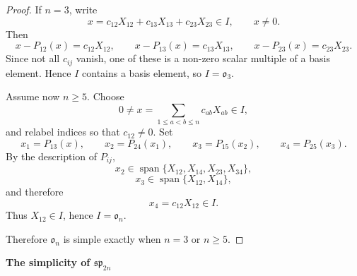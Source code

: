 \begin{proof}
    If $n=3$, write
    \[
        x=c_{12}X_{12}+c_{13}X_{13}+c_{23}X_{23}\in I,\qquad x\neq0.
    \]
    Then
    \[
        x-P_{12}(x)=c_{12}X_{12},\qquad
        x-P_{13}(x)=c_{13}X_{13},\qquad
        x-P_{23}(x)=c_{23}X_{23}.
    \]
    Since not all $c_{ij}$ vanish, one of these is a non-zero scalar multiple of a basis element. Hence $I$ contains a basis element, so $I=\mathfrak{o}_3$.

    Assume now $n\ge5$. Choose
    \[
        0\neq x=\sum_{1\le a<b\le n} c_{ab}X_{ab}\in I,
    \]
    and relabel indices so that $c_{12}\neq0$. Set
    \[
        x_1=P_{13}(x),\qquad x_2=P_{24}(x_1),\qquad x_3=P_{15}(x_2),\qquad x_4=P_{25}(x_3).
    \]
    By the description of $P_{ij}$,
    \[
        x_2\in \operatorname{span}\{X_{12},X_{14},X_{23},X_{34}\},
    \]
    \[
        x_3\in \operatorname{span}\{X_{12},X_{14}\},
    \]
    and therefore
    \[
        x_4=c_{12}X_{12}\in I.
    \]
    Thus $X_{12}\in I$, hence $I=\mathfrak{o}_n$.

    Therefore $\mathfrak{o}_n$ is simple exactly when $n=3$ or $n\ge5$.
\end{proof}

\textbf{The simplicity of $\mathfrak{sp}_{2n}$}

